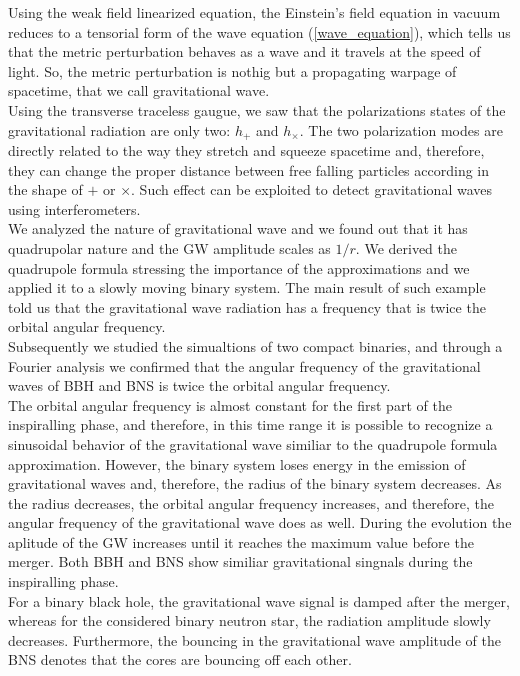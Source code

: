 Using the weak field linearized equation, the Einstein's field equation in vacuum reduces to a tensorial form of the wave equation (\ref{wave_equation}), which tells us that the metric perturbation behaves as a wave and it travels at the speed of light.
So, the metric perturbation is nothig but a propagating warpage of spacetime, that we call gravitational wave.\\
Using the transverse traceless gaugue, we saw that the polarizations states of the gravitational radiation are only two: $h_{+}$ and $h_{\times}$.
The two polarization modes are directly related to the way they stretch and squeeze spacetime and, therefore, they can change the proper distance between free falling particles according in the shape of $+$ or $\times$.
Such effect can be exploited to detect gravitational waves using interferometers.\\
We analyzed the nature of gravitational wave  and we found out that it has quadrupolar nature and the GW amplitude scales as $1/r$.
We derived the quadrupole formula stressing the importance of the approximations and we applied it to a slowly moving binary system.
The main result of such example told us that the gravitational wave radiation has a frequency that is twice the orbital angular frequency.\\
Subsequently we studied the simualtions of two compact binaries, and through a Fourier analysis we confirmed that the angular frequency of the gravitational waves of BBH and BNS is twice the orbital angular frequency.\\
The orbital angular frequency is almost constant for the first part of the inspiralling phase, and therefore, in this time range it is possible to recognize a sinusoidal behavior of the gravitational wave similiar to the quadrupole formula approximation.
However, the binary system loses energy in the emission of gravitational waves and, therefore, the radius of the binary system decreases. 
As the radius decreases, the orbital angular frequency increases, and therefore, the angular frequency of the gravitational wave does as well. 
During the evolution the aplitude of the GW increases until it reaches the maximum value before the merger.
Both BBH and BNS show similiar gravitational singnals during the inspiralling phase.\\
For a binary black hole, the gravitational wave signal is damped after the merger, whereas for the considered binary neutron star, the radiation amplitude slowly decreases.
Furthermore, the bouncing in the gravitational wave amplitude of the BNS denotes that the cores are bouncing off each other.\\
